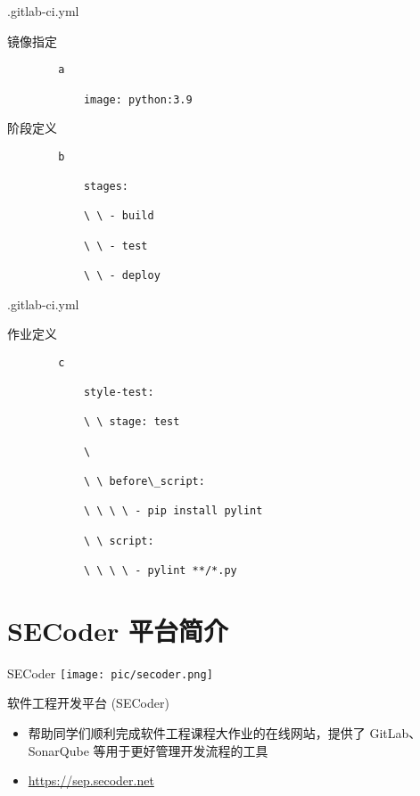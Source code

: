 \documentclass{beamer}
\begin{document}
\begin{frame}{.gitlab-ci.yml}
    \begin{block}{镜像指定}
        \begin{lstlisting}
        a
        
            image: python:3.9
        \end{lstlisting}
    \end{block}
    \begin{block}{阶段定义}
        \begin{lstlisting}
        b
        
            stages:
            
            \ \ - build
            
            \ \ - test
            
            \ \ - deploy
        \end{lstlisting}
    \end{block}
\end{frame}

\begin{frame}{.gitlab-ci.yml}
    \begin{block}{作业定义}
        \begin{lstlisting}
        c
        
            style-test:
            
            \ \ stage: test
            
            \ 
            
            \ \ before\_script:
            
            \ \ \ \ - pip install pylint
            
            \ \ script:
            
            \ \ \ \ - pylint **/*.py
        \end{lstlisting}
    \end{block}
\end{frame}

\section{SECoder 平台简介}

\begin{frame}{SECoder}
    \centering\texttt{[image: pic/secoder.png]}
    \begin{block}{软件工程开发平台 (SECoder)}
        \begin{itemize}
            \item 帮助同学们顺利完成软件工程课程大作业的在线网站，提供了 GitLab、SonarQube 等用于更好管理开发流程的工具
            \item \url{https://sep.secoder.net}
        \end{itemize}
    \end{block}
\end{frame}
\end{document}

